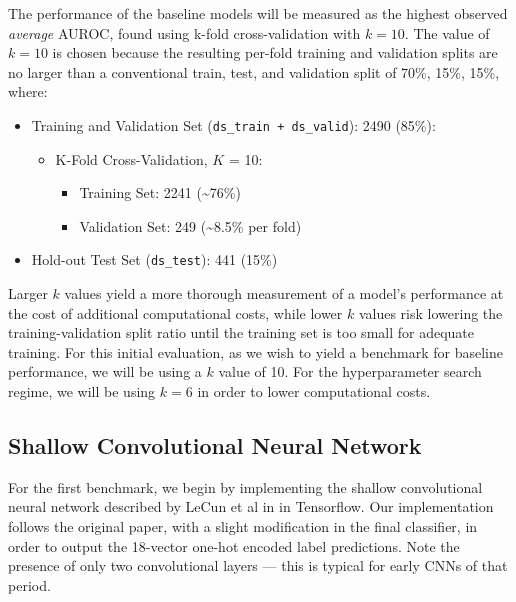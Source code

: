 The performance of the baseline models will be measured as the highest observed \emph{average} AUROC, found using k-fold cross-validation with \(k=10\). The value of \(k=10\) is chosen because the resulting per-fold training and validation splits are no larger than a conventional train, test, and validation split of 70\%, 15\%, 15\%, where:

\begin{itemize}
    \item Training and Validation Set (\texttt{ds\_train + ds\_valid}): 2490 (85\%):
    \begin{itemize}
        \item K-Fold Cross-Validation, $K$ = 10:
        \begin{itemize}
            \item Training Set:  2241  (\textasciitilde76\%)
            \item Validation Set: 249  (\textasciitilde8.5\% per fold)
        \end{itemize}
    \end{itemize}
    \item Hold-out Test Set (\texttt{ds\_test}): 441 (15\%)
\end{itemize}

\noindent
Larger \(k\) values yield a more thorough measurement of a model's performance at the cost of additional computational costs, while lower \(k\) values risk lowering the training-validation split ratio until the training set is too small for adequate training. For this initial evaluation, as we wish to yield a benchmark for baseline performance, we will be using a \(k\) value of 10. For the hyperparameter search regime, we will be using \(k=6\) in order to lower computational costs.

\subsection{Shallow Convolutional Neural Network}

For the first benchmark, we begin by implementing the shallow convolutional neural network described by LeCun et al in \autocite{lenet1998} in Tensorflow. Our implementation follows the original paper, with a slight modification in the final classifier, in order to output the 18-vector one-hot encoded label predictions. Note the presence of only two convolutional layers --- this is typical for early CNNs of that period.



